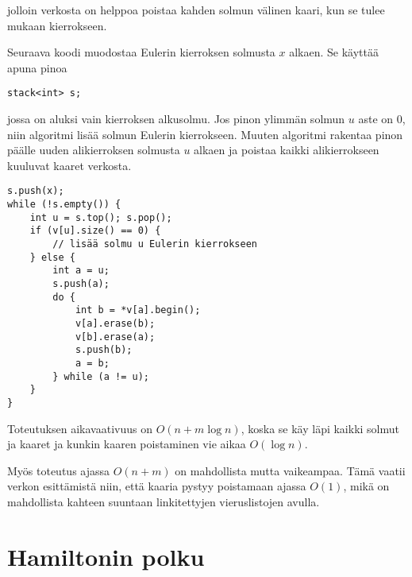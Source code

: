 jolloin verkosta on helppoa poistaa kahden solmun
välinen kaari, kun se tulee mukaan kierrokseen.

Seuraava koodi muodostaa Eulerin kierroksen
solmusta $x$ alkaen.
Se käyttää apuna pinoa
\begin{lstlisting}
stack<int> s;
\end{lstlisting}
jossa on aluksi vain kierroksen alkusolmu.
Jos pinon ylimmän solmun $u$ aste on 0,
niin algoritmi lisää solmun Eulerin kierrokseen.
Muuten algoritmi rakentaa pinon päälle uuden alikierroksen
solmusta $u$ alkaen ja poistaa kaikki alikierrokseen
kuuluvat kaaret verkosta.

\begin{lstlisting}
s.push(x);
while (!s.empty()) {
    int u = s.top(); s.pop();
    if (v[u].size() == 0) {
        // lisää solmu u Eulerin kierrokseen
    } else {
        int a = u;
        s.push(a);
        do {
            int b = *v[a].begin();
            v[a].erase(b);
            v[b].erase(a);
            s.push(b);
            a = b;
        } while (a != u);
    }
}
\end{lstlisting}
Toteutuksen aikavaativuus on $O(n+m \log n)$,
koska se käy läpi kaikki solmut ja kaaret
ja kunkin kaaren poistaminen vie aikaa $O(\log n)$.

Myös toteutus ajassa $O(n+m)$
on mahdollista mutta vaikeampaa.
Tämä vaatii verkon esittämistä niin,
että kaaria pystyy poistamaan ajassa $O(1)$,
mikä on mahdollista kahteen suuntaan
linkitettyjen vieruslistojen avulla.

\section{Hamiltonin polku}

